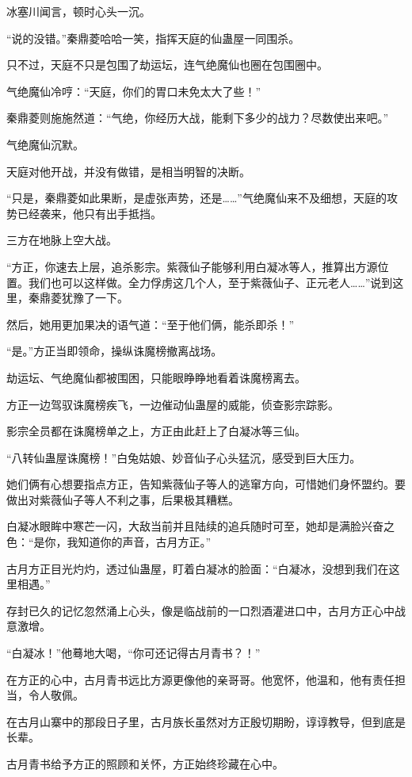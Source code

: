 \begin{this_body}
冰塞川闻言，顿时心头一沉。

“说的没错。”秦鼎菱哈哈一笑，指挥天庭的仙蛊屋一同围杀。

只不过，天庭不只是包围了劫运坛，连气绝魔仙也圈在包围圈中。

气绝魔仙冷哼：“天庭，你们的胃口未免太大了些！”

秦鼎菱则施施然道：“气绝，你经历大战，能剩下多少的战力？尽数使出来吧。”

气绝魔仙沉默。

天庭对他开战，并没有做错，是相当明智的决断。

“只是，秦鼎菱如此果断，是虚张声势，还是……”气绝魔仙来不及细想，天庭的攻势已经袭来，他只有出手抵挡。

三方在地脉上空大战。

“方正，你速去上层，追杀影宗。紫薇仙子能够利用白凝冰等人，推算出方源位置。我们也可以这样做。全力俘虏这几个人，至于紫薇仙子、正元老人……”说到这里，秦鼎菱犹豫了一下。

然后，她用更加果决的语气道：“至于他们俩，能杀即杀！”

“是。”方正当即领命，操纵诛魔榜撤离战场。

劫运坛、气绝魔仙都被围困，只能眼睁睁地看着诛魔榜离去。

方正一边驾驭诛魔榜疾飞，一边催动仙蛊屋的威能，侦查影宗踪影。

影宗全员都在诛魔榜单之上，方正由此赶上了白凝冰等三仙。

“八转仙蛊屋诛魔榜！”白兔姑娘、妙音仙子心头猛沉，感受到巨大压力。

她们俩有心想要指点方正，告知紫薇仙子等人的逃窜方向，可惜她们身怀盟约。要做出对紫薇仙子等人不利之事，后果极其糟糕。

白凝冰眼眸中寒芒一闪，大敌当前并且陆续的追兵随时可至，她却是满脸兴奋之色：“是你，我知道你的声音，古月方正。”

古月方正目光灼灼，透过仙蛊屋，盯着白凝冰的脸面：“白凝冰，没想到我们在这里相遇。”

存封已久的记忆忽然涌上心头，像是临战前的一口烈酒灌进口中，古月方正心中战意激增。

“白凝冰！”他蓦地大喝，“你可还记得古月青书？！”

在方正的心中，古月青书远比方源更像他的亲哥哥。他宽怀，他温和，他有责任担当，令人敬佩。

在古月山寨中的那段日子里，古月族长虽然对方正殷切期盼，谆谆教导，但到底是长辈。

古月青书给予方正的照顾和关怀，方正始终珍藏在心中。


\end{this_body}
